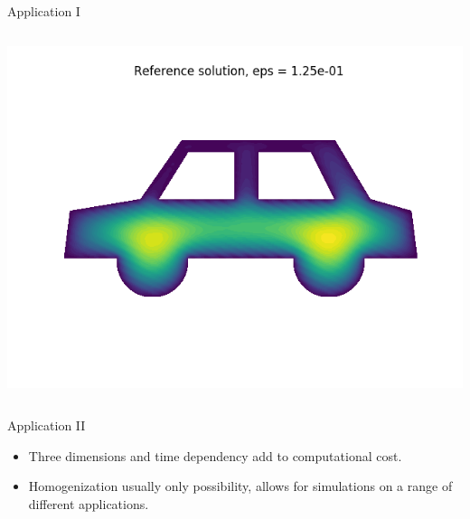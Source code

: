 \documentclass{beamer}
\begin{document}
\begin{frame}[t]{Application I}
\begin{columns}
\begin{column}[c]{.5\textwidth}
    \includegraphics[width=0.65\linewidth]{carw_reference_eps_power_3.png}

 \end{column}
\end{columns}
\end{frame}

\begin{frame}[t]{Application II}
  
  \begin{itemize}
  \item Three dimensions and time dependency add to computational cost.
  \item Homogenization usually only possibility, allows for simulations on a range of different applications.
  \end{itemize}
  \centering
\end{frame}
\end{document}
